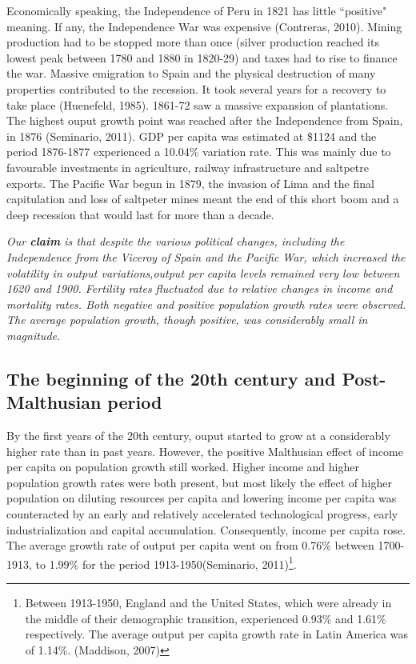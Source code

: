 \documentclass[12pt]{article}%
\begin{document}
Economically speaking, the Independence of Peru in 1821 has little ``positive" meaning. If any, the Independence War was expensive (Contreras, 2010). Mining production had to be stopped more than once (silver production reached its lowest peak between 1780 and 1880 in 1820-29) and taxes had to rise to finance the war. Massive emigration to Spain and the physical destruction of many properties contributed to the recession. It took several years for a recovery to take place (Huenefeld, 1985). 1861-72 saw a massive expansion of plantations. The highest ouput growth point was reached after the Independence from Spain, in 1876 (Seminario, 2011). GDP per capita was estimated at \$1124 and the period 1876-1877 experienced a 10.04\% variation rate. This was mainly due to favourable investments in agriculture, railway infrastructure and saltpetre exports. The Pacific War begun in 1879, the invasion of Lima and the final capitulation and loss of saltpeter mines meant the end of this short boom and a deep recession that would last for more than a decade.

\emph{Our \textbf{claim} is that despite the various political changes, including the Independence from the Viceroy of Spain and the Pacific War, which increased the volatility in output variations,output per capita levels remained very low between 1620 and 1900. Fertility rates fluctuated due to relative changes in income and mortality rates. Both negative and positive population growth rates were observed. The average population growth, though positive, was considerably small in magnitude.}
\subsection{The beginning of the 20th century and Post-Malthusian period}
By the first years of the 20th century, ouput started to grow at a considerably higher rate than in past years. However, the positive Malthusian effect of income per capita on population growth still worked. Higher income and higher population growth rates were both present, but most likely the effect of higher population on diluting resources per capita and lowering income per capita was counteracted by an early and relatively accelerated technological progress, early industrialization and capital accumulation. Consequently, income per capita rose. The average growth rate of output per capita went on from 0.76\% between 1700-1913, to 1.99\% for the period 1913-1950(Seminario, 2011)\footnote{Between 1913-1950, England and the United States, which were already in the middle of their demographic transition, experienced 0.93\% and 1.61\% respectively. The average output per capita growth rate in Latin America was of 1.14\%. (Maddison, 2007)}.
\end{document}
